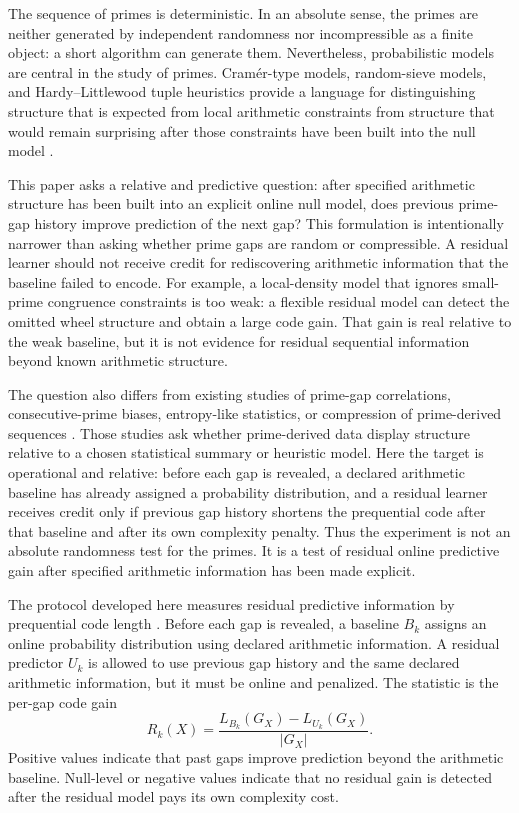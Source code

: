 \documentclass[11pt]{article}
\begin{document}
The sequence of primes is deterministic. In an absolute sense, the primes are neither generated by independent randomness nor incompressible as a finite object: a short algorithm can generate them. Nevertheless, probabilistic models are central in the study of primes. Cram\'er-type models, random-sieve models, and Hardy--Littlewood tuple heuristics provide a language for distinguishing structure that is expected from local arithmetic constraints from structure that would remain surprising after those constraints have been built into the null model \citep{cramer1936,hardylittlewood1923,maier1985,montgomerysoundararajan2004,banksetal2023,lemkeoliver2016}.

This paper asks a relative and predictive question: after specified arithmetic structure has been built into an explicit online null model, does previous prime-gap history improve prediction of the next gap? This formulation is intentionally narrower than asking whether prime gaps are random or compressible. A residual learner should not receive credit for rediscovering arithmetic information that the baseline failed to encode. For example, a local-density model that ignores small-prime congruence constraints is too weak: a flexible residual model can detect the omitted wheel structure and obtain a large code gain. That gain is real relative to the weak baseline, but it is not evidence for residual sequential information beyond known arithmetic structure.

The question also differs from existing studies of prime-gap correlations, consecutive-prime biases, entropy-like statistics, or compression of prime-derived sequences \citep{lemkeoliver2016,kumar2003}. Those studies ask whether prime-derived data display structure relative to a chosen statistical summary or heuristic model. Here the target is operational and relative: before each gap is revealed, a declared arithmetic baseline has already assigned a probability distribution, and a residual learner receives credit only if previous gap history shortens the prequential code after that baseline and after its own complexity penalty. Thus the experiment is not an absolute randomness test for the primes. It is a test of residual online predictive gain after specified arithmetic information has been made explicit.

The protocol developed here measures residual predictive information by prequential code length \citep{dawid1984,barronrissanenyu1998,grunwald2019}. Before each gap is revealed, a baseline $B_k$ assigns an online probability distribution using declared arithmetic information. A residual predictor $U_k$ is allowed to use previous gap history and the same declared arithmetic information, but it must be online and penalized. The statistic is the per-gap code gain
\[
R_k(X)=\frac{L_{B_k}(G_X)-L_{U_k}(G_X)}{|G_X|}.
\]
Positive values indicate that past gaps improve prediction beyond the arithmetic baseline. Null-level or negative values indicate that no residual gain is detected after the residual model pays its own complexity cost.
\end{document}
